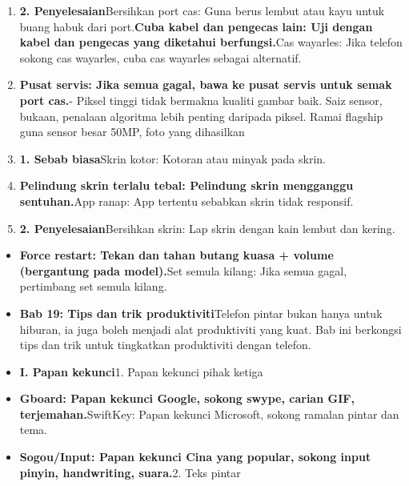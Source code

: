 
\begin{enumerate}
  \item \textbf{2. Penyelesaian}Bersihkan port cas: Guna berus lembut atau kayu untuk buang habuk dari port.\textbf{Cuba kabel dan pengecas lain: Uji dengan kabel dan pengecas yang diketahui berfungsi.}Cas wayarles: Jika telefon sokong cas wayarles, cuba cas wayarles sebagai alternatif.
  \item \textbf{Pusat servis: Jika semua gagal, bawa ke pusat servis untuk semak port cas.}- Piksel tinggi tidak bermakna kualiti gambar baik. Saiz sensor, bukaan, penalaan algoritma lebih penting daripada piksel. Ramai flagship guna sensor besar 50MP, foto yang dihasilkan
  \item \textbf{1. Sebab biasa}Skrin kotor: Kotoran atau minyak pada skrin.
  \item \textbf{Pelindung skrin terlalu tebal: Pelindung skrin mengganggu sentuhan.}App ranap: App tertentu sebabkan skrin tidak responsif.
  \item \textbf{2. Penyelesaian}Bersihkan skrin: Lap skrin dengan kain lembut dan kering.
\end{enumerate}


\begin{itemize}
  \item \textbf{Force restart: Tekan dan tahan butang kuasa + volume (bergantung pada model).}Set semula kilang: Jika semua gagal, pertimbang set semula kilang.
  \item \textbf{Bab 19: Tips dan trik produktiviti}Telefon pintar bukan hanya untuk hiburan, ia juga boleh menjadi alat produktiviti yang kuat. Bab ini berkongsi tips dan trik untuk tingkatkan produktiviti dengan telefon.
  \item \textbf{I. Papan kekunci}1. Papan kekunci pihak ketiga
  \item \textbf{Gboard: Papan kekunci Google, sokong swype, carian GIF, terjemahan.}SwiftKey: Papan kekunci Microsoft, sokong ramalan pintar dan tema.
  \item \textbf{Sogou/Input: Papan kekunci Cina yang popular, sokong input pinyin, handwriting, suara.}2. Teks pintar
\end{itemize}


